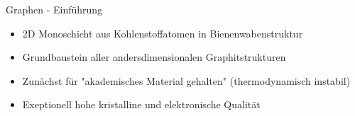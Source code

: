 \documentclass[../defence.tex]{subfiles}
\begin{document}
  \begin{frame}{Graphen - Einführung}
      \begin{itemize}
        \item 2D Monoschicht aus Kohlenstoffatomen in Bienenwabenstruktur
        \item Grundbaustein aller andersdimensionalen Graphitstrukturen
        \item Zunächst für "akademisches Material gehalten" (thermodynamisch instabil)
        \item Exeptionell hohe kristalline und elektronische Qualität
      \end{itemize}
  \end{frame}
\end{document}
